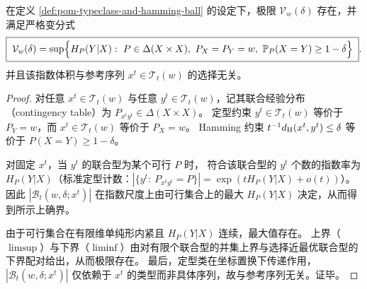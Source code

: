 \begin{theorem}[指数体积的存在性与变分表示]\label{thm:pom-typeclass-hamming-ball-volume-variational}
在定义 \ref{def:pom-typeclass-and-hamming-ball} 的设定下，极限 \(\mathcal V_w(\delta)\) 存在，并满足严格变分式
\[
\boxed{\;
\mathcal V_w(\delta)
=
\sup\Bigl\{H_P(Y|X):\ P\in\Delta(X\times X),\ P_X=P_Y=w,\ \mathbb P_P(X=Y)\ge 1-\delta\Bigr\}\; }.
\]
并且该指数体积与参考序列 \(x^t\in\mathcal T_t(w)\) 的选择无关。
\end{theorem}
\begin{proof}
对任意 \(x^t\in\mathcal T_t(w)\) 与任意 \(y^t\in\mathcal T_t(w)\)，记其联合经验分布（contingency table）为 \(P_{x^t y^t}\in\Delta(X\times X)\)。
定型约束 \(y^t\in\mathcal T_t(w)\) 等价于 \(P_Y=w\)，而 \(x^t\in\mathcal T_t(w)\) 等价于 \(P_X=w\)。
Hamming 约束 \(t^{-1}d_{\rm H}(x^t,y^t)\le \delta\) 等价于 \(P(X=Y)\ge 1-\delta\)。
\par
对固定 \(x^t\)，当 \(y^t\) 的联合型为某个可行 \(P\) 时，
符合该联合型的 \(y^t\) 个数的指数率为 \(H_P(Y|X)\)（标准定型计数：\(|\{y^t:\ P_{x^t y^t}=P\}|=\exp(tH_P(Y|X)+o(t))\)）。
因此 \(|\mathcal B_t(w,\delta;x^t)|\) 在指数尺度上由可行集合上的最大 \(H_P(Y|X)\) 决定，从而得到所示上确界。
\par
由于可行集合在有限维单纯形内紧且 \(H_P(Y|X)\) 连续，最大值存在。
上界（\(\limsup\)）与下界（\(\liminf\)）由对有限个联合型的并集上界与选择近最优联合型的下界配对给出，从而极限存在。
最后，定型类在坐标置换下传递作用，\(|\mathcal B_t(w,\delta;x^t)|\) 仅依赖于 \(x^t\) 的类型而非具体序列，故与参考序列无关。证毕。
\end{proof}

